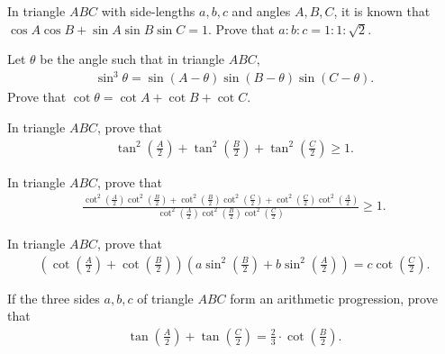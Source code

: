 \begin{question}[name=1986 IIT JEE]
    In triangle $ABC$ with side-lengths $a,b,c$ and angles $A,B,C$, it is known that $\cos A \cos B + \sin A \sin B \sin C = 1$. Prove that $a:b:c = 1:1:\sqrt 2$.
\end{question}

\begin{question}
    Let $\theta$ be the angle such that in triangle $ABC$,
    \begin{align*}
        \sin^3\theta = \sin(A-\theta)\sin(B-\theta)\sin(C-\theta).
    \end{align*}
    Prove that $\cot \theta = \cot A + \cot B + \cot C$.
\end{question}

\begin{question}
    In triangle $ABC$, prove that
    \begin{align*}
        \tan^2\left(\frac{A}{2}\right)+\tan^2\left(\frac{B}{2}\right)+\tan^2\left(\frac{C}{2}\right) \geq 1.
    \end{align*}
\end{question}

\begin{question}
    In triangle $ABC$, prove that
    \begin{align*}
        \frac{\displaystyle\cot^2\left(\frac{A}{2}\right)\cot^2\left(\frac{B}{2}\right)+\cot^2\left(\frac{B}{2}\right)\cot^2\left(\frac{C}{2}\right)+\cot^2\left(\frac{C}{2}\right)\cot^2\left(\frac{A}{2}\right)}{\displaystyle\cot^2\left(\frac{A}{2}\right)\cot^2\left(\frac{B}{2}\right)\cot^2\left(\frac{C}{2}\right)} \geq 1.
    \end{align*}
\end{question}


\begin{question}
    In triangle $ABC$, prove that
    \begin{align*}
        \left(\cot\left(\frac{A}{2}\right)+\cot\left(\frac{B}{2}\right)\right)\left(a\sin^2\left(\frac{B}{2}\right)+b\sin^2\left(\frac{A}{2}\right)\right) = c \cot\left(\frac{C}{2}\right).
    \end{align*}
\end{question}


\begin{question}
    If the three sides $a,b,c$ of triangle $ABC$ form an arithmetic progression, prove that
    \begin{align*}
        \tan\left(\frac{A}{2}\right)+\tan\left(\frac{C}{2}\right)=\frac{2}{3}\cdot \cot\left(\frac{B}{2}\right).
    \end{align*}
\end{question}

